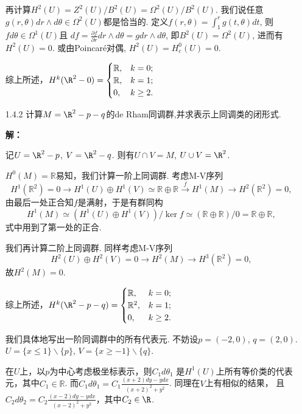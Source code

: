 \begin{enumerate}
        \qquad 再计算$H^2(U)=Z^2(U)/B^2(U)=\Omega^2(U)/B^2(U)$. 
        我们说任意$g(r,\theta)dr\wedge d\theta\in \Omega^2(U)$都是恰当的.
        定义$f(r,\theta)=\int_1^r g(t,\theta)dt$, 则$fd\theta\in \Omega^1(U)$且
        $df=\frac{\partial f}{\partial r}dr\wedge d\theta=gdr\wedge d\theta$, 
        即$B^2(U)=\Omega^2(U)$, 进而有$H^2(U)=0$.        
        或由Poincaré对偶, $H^2(U)=H^0_c(U)=0$.

        \qquad 综上所述，$H^k(\R^2-0)=\begin{cases}
                                    \mathbb{R}, &k=0;\\
                                    \mathbb{R}, &k=1;\\
                                    0, &k\geq 2.
        \end{cases}$

    \item[1.4.2] 计算$M=\R^2-p-q$的de Rham同调群,并求表示上同调类的闭形式.
    \item[\textbf{解：}]

        \qquad 记$U=\R^2-p$, $V=\R^2-q$. 则有$U\cap V=M$, $U\cup V=\R^2$.

        \qquad $H^0(M)=\mathbb{R}$易知，我们计算一阶上同调群. 考虑M-V序列
            $$H^1(\mathbb{R}^2)=0\rightarrow H^1(U)\oplus H^1(V)
            \simeq \mathbb{R}\oplus \mathbb{R}\stackrel{f}{\longrightarrow} H^1(M)\rightarrow H^2(\mathbb{R}^2)=0,$$
        由最后一处正合知$f$是满射，于是有群同构
            $$H^1(M)\simeq (H^1(U)\oplus H^1(V))/\ker f
            \simeq (\mathbb{R}\oplus \mathbb{R})/0=\mathbb{R}\oplus \mathbb{R},$$
        式中用到了第一处的正合.

        \qquad 我们再计算二阶上同调群. 同样考虑M-V序列
            $$H^2(U)\oplus H^2(V)=0\rightarrow H^2(M)\rightarrow H^3(\mathbb{R}^2)=0,$$
        故$H^2(M)=0$.

        \qquad 综上所述，$H^k(\R^2-p-q)=\begin{cases}
                                    \mathbb{R}, &k=0;\\
                                    \mathbb{R}^2, &k=1;\\
                                    0, &k\geq 2.
        \end{cases}$

        \qquad 我们具体地写出一阶同调群中的所有代表元. 不妨设$p=(-2,0)$, $q=(2,0)$. 
        $U=\{x\leq 1\}\backslash \{p\}$, $V=\{x\geq -1\}\backslash \{q\}$.\par
        \qquad 在$U$上，以$p$为中心考虑极坐标表示，则$C_1d\theta_1$
        是$H^1(U)$上所有等价类的代表元，其中$C_1\in \mathbb{R}$. 
        而$C_1d\theta_1=C_1\frac{(x+2)dy-ydx}{(x+2)^2+y^2}$. 
        同理在$V$上有相似的结果，
        且$C_2d\theta_2=C_2\frac{(x-2)dy-ydx}{(x-2)^2+y^2}$，其中$C_2\in \R$.


\end{enumerate}
